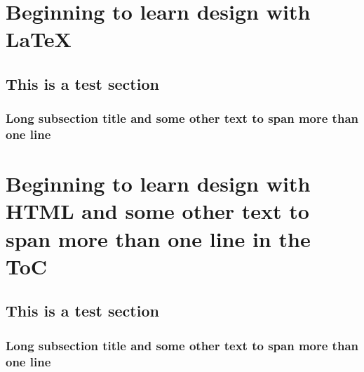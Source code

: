 \documentclass{book}
\makeatletter
\newcommand{\titleForTheToc}{Another title for the table of contents}
\renewcommand\tableofcontents{%
			\if@twocolumn
				\@restonecoltrue\onecolumn
			\else
				\@restonecolfalse
			\fi
			\chapter*{%
				{\color{myred}\contentsname}%
				\@mkboth{%
					\MakeUppercase\contentsname%
				}{\MakeUppercase\contentsname}%
			}%
			\@starttoc{toc}%
			\if@restonecol\twocolumn\fi
		}
\makeatother
\begin{document}
%
%
\tableofcontents

\tableofcontents

\chapter{Beginning to learn design with \LaTeX}
\section{This is a test section}
\subsection{Long subsection title and some other text to span more than one line}

\newpage\setcounter{page}{123}%

\chapter{Beginning to learn design with HTML and some other text to span more than one line in the ToC}
\section{This is a test section}
\subsection{Long subsection title and some other text to span more than one line}
\end{document}
